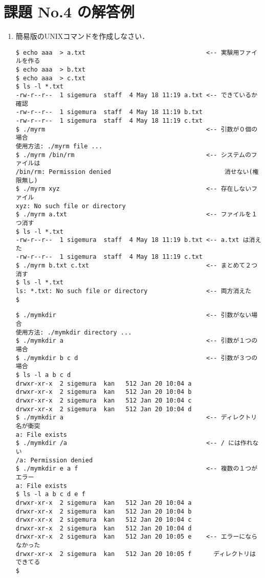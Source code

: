 \documentclass[a4j,twcolumn,11pt,nomag]{ltjarticle}      %
\begin{document}
\onecolumn

\section*{課題 No.4 の解答例}
\begin{enumerate}
\item 簡易版のUNIXコマンドを作成しなさい．
\begin{lstlisting}[caption=myrmの実行例（動作テスト！！）]
$ echo aaa  > a.txt                                 <-- 実験用ファイルを作る
$ echo aaa  > b.txt
$ echo aaa  > c.txt
$ ls -l *.txt
-rw-r--r--  1 sigemura  staff  4 May 18 11:19 a.txt <-- できているか確認
-rw-r--r--  1 sigemura  staff  4 May 18 11:19 b.txt
-rw-r--r--  1 sigemura  staff  4 May 18 11:19 c.txt
$ ./myrm                                            <-- 引数が０個の場合
使用方法: ./myrm file ...
$ ./myrm /bin/rm                                    <-- システムのファイルは
/bin/rm: Permission denied                               消せない(権限無し)
$ ./myrm xyz                                        <-- 存在しないファイル
xyz: No such file or directory
$ ./myrm a.txt                                      <-- ファイルを１つ消す
$ ls -l *.txt
-rw-r--r--  1 sigemura  staff  4 May 18 11:19 b.txt <-- a.txt は消えた
-rw-r--r--  1 sigemura  staff  4 May 18 11:19 c.txt
$ ./myrm b.txt c.txt                                <-- まとめて２つ消す
$ ls -l *.txt
ls: *.txt: No such file or directory                <-- 両方消えた
$ 
\end{lstlisting}

\begin{lstlisting}[caption=mymkdirの実行例（動作テスト！！）]
$ ./mymkdir                                         <-- 引数がない場合
使用方法: ./mymkdir directory ...
$ ./mymkdir a                                       <-- 引数が１つの場合
$ ./mymkdir b c d                                   <-- 引数が３つの場合
$ ls -l a b c d
drwxr-xr-x  2 sigemura  kan   512 Jan 20 10:04 a
drwxr-xr-x  2 sigemura  kan   512 Jan 20 10:04 b
drwxr-xr-x  2 sigemura  kan   512 Jan 20 10:04 c
drwxr-xr-x  2 sigemura  kan   512 Jan 20 10:04 d
$ ./mymkdir a                                       <-- ディレクトリ名が衝突
a: File exists
$ ./mymkdir /a                                      <-- / には作れない
/a: Permission denied
$ ./mymkdir e a f                                   <-- 複数の１つがエラー
a: File exists
$ ls -l a b c d e f
drwxr-xr-x  2 sigemura  kan   512 Jan 20 10:04 a
drwxr-xr-x  2 sigemura  kan   512 Jan 20 10:04 b
drwxr-xr-x  2 sigemura  kan   512 Jan 20 10:04 c
drwxr-xr-x  2 sigemura  kan   512 Jan 20 10:04 d
drwxr-xr-x  2 sigemura  kan   512 Jan 20 10:05 e    <-- エラーにならなかった
drwxr-xr-x  2 sigemura  kan   512 Jan 20 10:05 f      ディレクトリはできてる
$
\end{lstlisting}


\end{enumerate}
\end{document}
